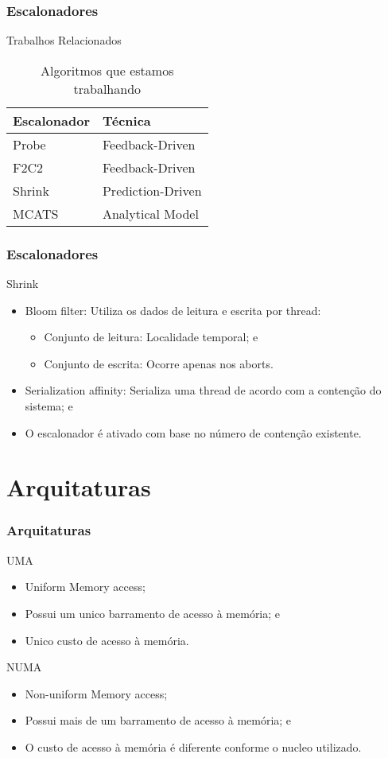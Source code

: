 \documentclass[10pt, pdf,xcolor=pdftex,dvipsnames,table]{beamer}
\begin{document}
\begin{frame} \frametitle{Escalonadores}
\begin{block}{Trabalhos Relacionados}
\begin{table}[]
\footnotesize
\centering
\caption{Algoritmos que estamos trabalhando}
\label{tab:compare}
\begin{tabular}{l|l}
\hline
Escalonador & Técnica \\ \hline
Probe & Feedback-Driven \\
F2C2 & Feedback-Driven \\
Shrink & Prediction-Driven  \\
MCATS & Analytical Model \\
\hline
\end{tabular}
\end{table}
\end{block}
\end{frame}

\begin{frame} \frametitle{Escalonadores}
\begin{block}{Shrink}
\begin{itemize}
    \item Bloom filter: Utiliza os dados de leitura e escrita por thread:
    \begin{itemize}
        \item Conjunto de leitura: Localidade temporal; e
        \item Conjunto de escrita: Ocorre apenas nos aborts.
    \end{itemize}
    \item Serialization affinity: Serializa uma thread de acordo com a contenção do sistema; e
    \item O escalonador é ativado com base no número de contenção existente.
\end{itemize}
\end{block}
\end{frame}

\section{Arquitaturas}
\begin{frame} \frametitle{Arquitaturas}
\begin{block}{UMA}
\begin{itemize}
	\item Uniform Memory access;
	\item Possui um unico barramento de acesso à memória; e
	\item Unico custo de acesso à memória.
\end{itemize}
\end{block}
\begin{block}{NUMA}
\begin{itemize}
	\item Non-uniform Memory access;
	\item Possui mais de um barramento de acesso à memória; e
	\item O custo de acesso à memória é diferente conforme o nucleo utilizado.
\end{itemize}
\end{block}
\end{frame}
\end{document}
